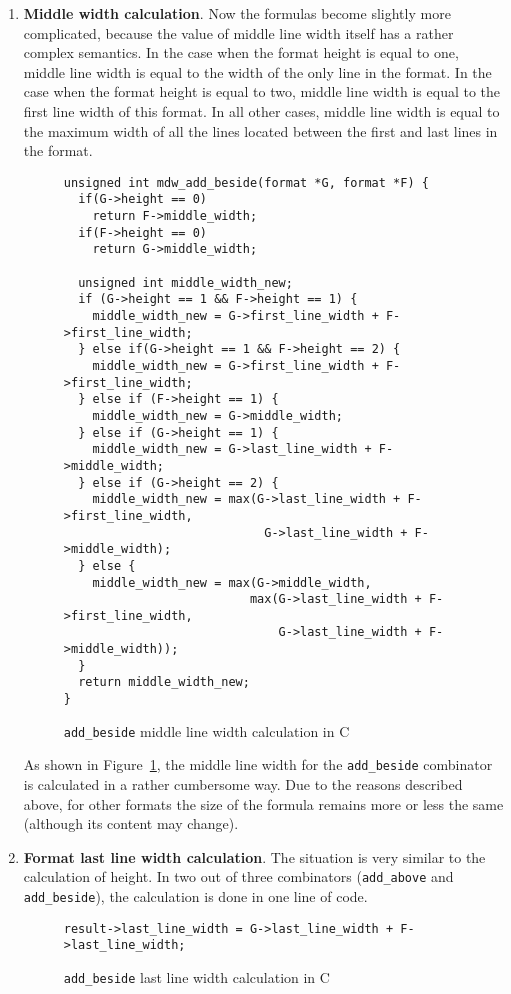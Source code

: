 \documentclass[14pt]{constructor-diploma}
\begin{document}
\begin{enumerate}
  \item \textbf{Middle width calculation}.
  Now the formulas become slightly more complicated, because the value of middle line width itself has a rather complex semantics. 
  In the case when the format height is equal to one, middle line width is equal to the width of the only line in the format. 
  In the case when the format height is equal to two, middle line width is equal to the first line width of this format. 
  In all other cases, middle line width is equal to the maximum width of all the lines located between the first and last lines in the format.
\begin{figure}[H]
\begin{mdframed}[backgroundcolor=bg]
\begin{verbatim}
unsigned int mdw_add_beside(format *G, format *F) {
  if(G->height == 0)
    return F->middle_width;
  if(F->height == 0)
    return G->middle_width;

  unsigned int middle_width_new;
  if (G->height == 1 && F->height == 1) {
    middle_width_new = G->first_line_width + F->first_line_width;
  } else if(G->height == 1 && F->height == 2) {
    middle_width_new = G->first_line_width + F->first_line_width;
  } else if (F->height == 1) {
    middle_width_new = G->middle_width;
  } else if (G->height == 1) {
    middle_width_new = G->last_line_width + F->middle_width;
  } else if (G->height == 2) {
    middle_width_new = max(G->last_line_width + F->first_line_width, 
                            G->last_line_width + F->middle_width);
  } else {
    middle_width_new = max(G->middle_width,
                          max(G->last_line_width + F->first_line_width, 
                              G->last_line_width + F->middle_width));
  }
  return middle_width_new;
}
\end{verbatim}
\end{mdframed}
\caption{\texttt{add\_beside} middle line width calculation in C}
\label{fig:mlw_calculation}
\end{figure}
As shown in Figure~\ref{fig:mlw_calculation}, the middle line width for the \texttt{add\_beside} combinator is calculated in a rather cumbersome way. 
Due to the reasons described above, for other formats the size of the formula remains more or less the same (although its content may change).

  \item \textbf{Format last line width calculation}. The situation is very similar to the calculation of height.
  In two out of three combinators (\texttt{add\_above} and \texttt{add\_beside}), the calculation is done in one line of code.
\begin{figure}[H]
\begin{mdframed}[backgroundcolor=bg]
\begin{verbatim}
result->last_line_width = G->last_line_width + F->last_line_width;
\end{verbatim}
\end{mdframed}
\caption{\texttt{add\_beside} last line width calculation in C}
\label{fig:llw_calculation}
\end{figure}


\end{enumerate}
\end{document}
